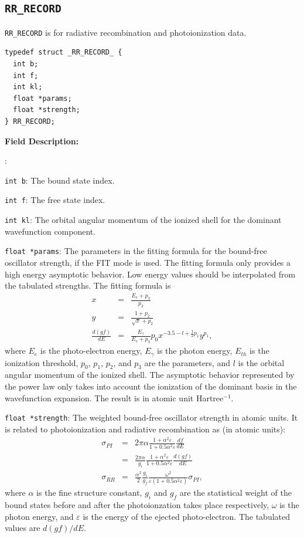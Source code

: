 \documentclass[twoside,letterpaper]{refrep}
\newenvironment{dbdesc}{\textbf{Field Description:} \begin{list}
	{:}{\setlength{\labelwidth}{2in}
	   \setlength{\leftmargin}{2in}
	   \setlength{\labelsep}{0.1in}
	   \setlength{\rightmargin}{0.2in}}}
	{\end{list}}
\begin{document}
\subsection{\texttt{RR\_RECORD}}
\texttt{RR\_RECORD} is for radiative recombination and photoionization data.

\begin{verbatim}
typedef struct _RR_RECORD_ {
  int b;
  int f;
  int kl;
  float *params;
  float *strength;
} RR_RECORD;
\end{verbatim}

\begin{dbdesc}
\item[\texttt{int b}:] The bound state index.
\item[\texttt{int f}:] The free state index.
\item[\texttt{int kl}:] The orbital angular momentum of the ionized shell for
the dominant wavefunction component.
\item[\texttt{float *params}:] The parameters in the fitting formula for the
bound-free oscillator strength, if the FIT mode is
used. The fitting formula only provides a high energy asymptotic behavior. Low
energy values should be interpolated from the tabulated strengths. The fitting
formula is
\begin{eqnarray}
x &=& \frac{E_e+p_3}{p_3} \nonumber\\
y &=& \frac{1+p_2}{\sqrt{x}+p_2} \nonumber\\
\frac{d(gf)}{dE} &=&
\frac{E_\gamma}{E_e+p_3}p_0x^{-3.5-l+\frac{1}{2}p_1}y^{p_1}, 
\end{eqnarray}
where $E_e$ is the photo-electron energy, $E_\gamma$ is the photon energy,
$E_{th}$ is the ionization threshold, $p_0$, $p_1$, $p_2$, and $p_3$ are the
parameters, and $l$ is the orbital angular momentum of the ionized
shell. The asymptotic behavior represented by the power law only takes into
account the ionization of the dominant basis in the wavefunction
expansion. The result is in atomic unit Hartree$^{-1}$.
\item[\texttt{float *strength}:] The weighted bound-free oscillator strength in
atomic units. It is related to photoionization and radiative recombination as
(in atomic units):
\begin{eqnarray}
\sigma_{PI} &=& 2\pi\alpha\frac{1+\alpha^2\varepsilon}{1+0.5\alpha^2\varepsilon}
                 \frac{d f}{d E} \nonumber\\
            &=& \frac{2\pi\alpha}{g_i}
		 \frac{1+\alpha^2\varepsilon}{1+0.5\alpha^2 \varepsilon} 
		 \frac{d(gf)}{d E} \nonumber\\
\sigma_{RR} &=& \frac{\alpha^2}{2}\frac{g_i}{g_f}
                \frac{\omega^2}{\varepsilon (1+0.5\alpha^2 \varepsilon)}
\sigma_{PI},
\end{eqnarray}
where $\alpha$ is the fine structure constant, $g_i$ and $g_f$ are the
statistical weight of the bound states before and after the photoionzation
takes place respectively, $\omega$ is the photon energy, and $\varepsilon$ is
the energy of the ejected photo-electron. The tabulated values are $d(gf)/dE$.
\end{dbdesc}
\end{document}
